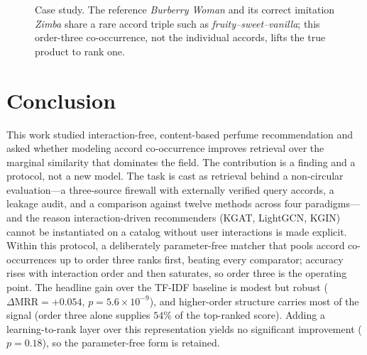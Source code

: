 \documentclass[conference]{IEEEtran}
\begin{document}
\begin{figure}[t]
\centering
{}
\caption{Case study. The reference \textit{Burberry Woman} and its correct imitation
\textit{Zimba} share a rare accord triple such as \textit{fruity--sweet--vanilla}; this
order-three co-occurrence, not the individual accords, lifts the true product to rank one.}
\label{fig:case}
\end{figure}

\FloatBarrier
\section{Conclusion}\label{sec:conclusion}
This work studied interaction-free, content-based perfume recommendation and asked whether
modeling accord co-occurrence improves retrieval over the marginal similarity that dominates
the field. The contribution is a finding and a protocol, not a new model. The task is cast as
retrieval behind a non-circular evaluation---a three-source firewall with externally verified
query accords, a leakage audit, and a comparison against twelve methods across four
paradigms---and the reason interaction-driven recommenders (KGAT, LightGCN, KGIN) cannot be
instantiated on a catalog without user interactions is made explicit. Within this protocol, a
deliberately parameter-free matcher that pools accord co-occurrences up to order three ranks
first, beating every comparator; accuracy rises with interaction order and then saturates, so
order three is the operating point. The headline gain over the TF-IDF baseline is modest but
robust ($\Delta\mathrm{MRR}=+0.054$, $p=5.6\times10^{-9}$), and higher-order structure carries
most of the signal (order three alone supplies $54\%$ of the top-ranked score). Adding a
learning-to-rank layer over this representation yields no significant improvement ($p=0.18$),
so the parameter-free form is retained.
\end{document}
